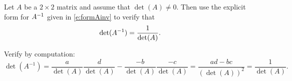 \documentclass{ximera}
\begin{document}
\begin{exercise} \label{c6.4.4}
Let $A$ be a $2\times 2$ matrix and assume that $\det(A)\neq 0$.
Then use the explicit form for $A^{-1}$ given in \eqref{e:formAinv}
to verify that
\[
\det(A^{-1}) = \frac{1}{\det(A)}.
\]

\begin{solution}

Verify by computation:
\[ \det(A^{-1}) = \frac{a}{\det(A)}\frac{d}{\det(A)} -
\frac{-b}{\det(A)}\frac{-c}{\det(A)} = \frac{ad - bc}{(\det(A))^2} =
\frac{1}{\det(A)}. \]

\end{solution}
\end{exercise}
\end{document}
